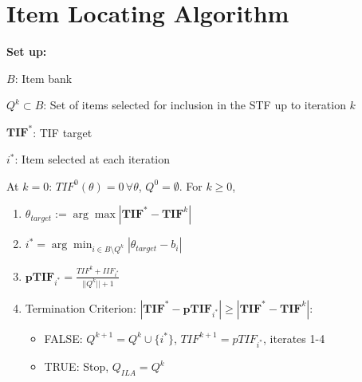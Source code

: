 \documentclass[12pt, a4paper, titilepage]{article}
\begin{document}
\section{Item Locating Algorithm}


\textbf{Set up: }

$B$: Item bank 


$Q^k \subset B$: Set of items selected for inclusion in the STF up to iteration $k$

$\mathbf{TIF}^*$: TIF target 

$i^*$: Item selected at each iteration



At $k = 0$: $TIF^0(\theta) = 0 \, \forall \theta$, $Q^0 = \emptyset$. For $k \geq 0$,

\begin{enumerate}
	\item $\theta_{target} := \arg \max |\mathbf{TIF}^* - \mathbf{TIF}^{k}|$
	\item $i^* = \arg \min_{i \in B\setminus Q^{k}} |\theta_{target} - b_i|$
	\item $\mathbf{pTIF}_{i^*} = \frac{TIF^k + IIF_{i^*}}{||Q^{k}|| + 1}$ %
	\item Termination Criterion: $|\mathbf{TIF}^* - \mathbf{pTIF}_{i^*}| \geq |\mathbf{TIF}^* - \mathbf{TIF}^{k}|$: 
	\begin{itemize}
		\item FALSE:  $Q^{k+1} = Q^{k} \cup \{i^*\}$, $TIF^{k+1} = pTIF_{i^*}$, iterates 1-4 
		\item TRUE: Stop, %
		$Q_{ILA} = Q^k$
	\end{itemize}
\end{enumerate}
\end{document}

